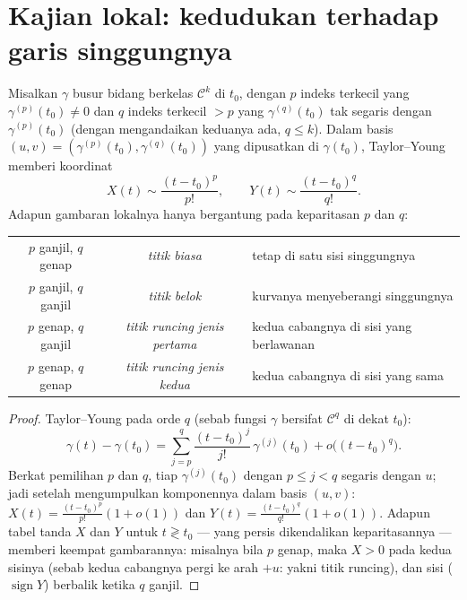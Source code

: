 \section{Kajian lokal: kedudukan terhadap garis singgungnya}

\begin{proposition}\label{prop:b2:curves:local}
Misalkan $\gamma$ busur bidang berkelas $\mathcal{C}^k$ di $t_0$, dengan
$p$ indeks terkecil yang $\gamma^{(p)}(t_0) \neq 0$ dan $q$
indeks terkecil $> p$ yang $\gamma^{(q)}(t_0)$ tak segaris dengan
$\gamma^{(p)}(t_0)$ (dengan mengandaikan keduanya ada, $q \leq k$). Dalam basis
$(u, v) = (\gamma^{(p)}(t_0), \gamma^{(q)}(t_0))$ yang dipusatkan di
$\gamma(t_0)$, Taylor--Young memberi koordinat
\[
X(t) \sim \frac{(t - t_0)^p}{p!},
\qquad
Y(t) \sim \frac{(t - t_0)^q}{q!} .
\]
Adapun gambaran lokalnya hanya bergantung pada keparitasan $p$ dan $q$:
\begin{center}
\begin{tabular}{c c l}
$p$ ganjil, $q$ genap & \emph{titik biasa} & tetap di satu sisi
singgungnya\\
$p$ ganjil, $q$ ganjil & \emph{titik belok} & kurvanya menyeberangi
singgungnya\\
$p$ genap, $q$ ganjil & \emph{titik runcing jenis pertama} & kedua
cabangnya di sisi yang berlawanan\\
$p$ genap, $q$ genap & \emph{titik runcing jenis kedua} & kedua
cabangnya di sisi yang sama\\
\end{tabular}
\end{center}
\end{proposition}

\begin{proof}
Taylor--Young pada orde $q$ (sebab fungsi $\gamma$ bersifat
$\mathcal{C}^q$ di dekat $t_0$):
\[
\gamma(t) - \gamma(t_0)
= \sum_{j=p}^{q} \frac{(t-t_0)^j}{j!}\,\gamma^{(j)}(t_0)
+ o\bigl((t-t_0)^q\bigr).
\]
Berkat pemilihan $p$ dan $q$, tiap $\gamma^{(j)}(t_0)$ dengan $p
\leq j < q$ segaris dengan $u$; jadi setelah mengumpulkan komponennya dalam
basis $(u, v)$: $X(t) = \frac{(t-t_0)^p}{p!}(1 + o(1))$ dan
$Y(t) = \frac{(t-t_0)^q}{q!}(1 + o(1))$. Adapun tabel tanda $X$ dan
$Y$ untuk $t \gtrless t_0$ --- yang persis dikendalikan keparitasannya ---
memberi keempat gambarannya: misalnya bila $p$ genap, maka $X > 0$ pada
kedua sisinya (sebab kedua cabangnya pergi ke arah $+u$: yakni titik runcing),
dan sisi  ($\operatorname{sign} Y$) berbalik
ketika $q$ ganjil.
\end{proof}

